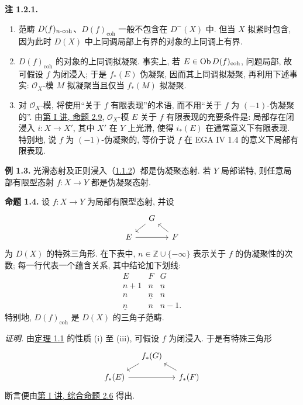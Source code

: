 \textbf{注 1.2.1.}
\begin{enumerate}[label=\alph*)]
\item 范畴 \(D(f)_{n\text{-}\mathrm{coh}}\)、\(D(f)_{\mathrm{coh}}\) 一般不包含在 \(D^{-}(X)\) 中. 但当 \(X\) 拟紧时包含, 因为此时 \(D(X)\) 中上同调局部上有界的对象的上同调上有界.

\item \(D(f)_{\mathrm{coh}}\) 的对象的上同调拟凝聚. 事实上, 若 \(E\in \operatorname{Ob} D(f)_{\mathrm{coh}}\), 问题局部, 故可假设 \(f\) 为闭浸入; 于是 \(f_*(E)\) 伪凝聚, 因而其上同调拟凝聚, 再利用下述事实: \(\mathcal O_X\)-模 \(M\) 拟凝聚当且仅当 \(f_*(M)\) 拟凝聚.

\item 对 \(\mathcal O_X\)-模, 将使用“关于 \(f\) 有限表现”的术语, 而不用“关于 \(f\) 为 \((-1)\)-伪凝聚的”. 由\hyperlink{sga6.e01.prop.2-9}{第 I 讲, 命题 2.9}, \(\mathcal O_X\)-模 \(E\) 关于 \(f\) 有限表现的充要条件是: 局部存在闭浸入 \(i:X\to X'\), 其中 \(X'\) 在 \(Y\) 上光滑, 使得 \(i_*(E)\) 在通常意义下有限表现. 特别地, 说 \(f\) 为 \((-1)\)-伪凝聚的, 等价于说 \(f\) 在 EGA IV 1.4 的意义下局部有限表现.
\end{enumerate}

\textbf{例 1.3.} 光滑态射及正则浸入（\hyperlink{sga6.e03.rem.1-1-2}{1.1.2}）都是伪凝聚态射. 若 \(Y\) 局部诺特, 则任意局部有限型态射 \(f:X\to Y\) 都是伪凝聚态射.

\textbf{命题 1.4.} 设 \(f:X\to Y\) 为局部有限型态射, 并设
\[
\begin{tikzcd}[column sep=small,row sep=small]
&G\arrow[dl]&\\
E\arrow[rr]&&F\arrow[ul]
\end{tikzcd}
\]
为 \(D(X)\) 的特殊三角形. 在下表中, \(n\in \mathbb Z\cup\{-\infty\}\) 表示关于 \(f\) 的伪凝聚性的次数; 每一行代表一个蕴含关系, 其中结论加下划线:
\[
\begin{array}{ccc}
E&F&G\\
n+1&n&\underline n\\
n&\underline n&n\\
\underline n&n&n-1.
\end{array}
\]
特别地, \(D(f)_{\mathrm{coh}}\) 是 \(D(X)\) 的三角子范畴.

\emph{证明.} 由\hyperlink{sga6.e03.thm.1-1}{定理 1.1} 的性质 (i) 至 (iii), 可假设 \(f\) 为闭浸入. 于是有特殊三角形
\[
\begin{tikzcd}[column sep=small,row sep=small]
&f_*(G)\arrow[dl]&\\
f_*(E)\arrow[rr]&&f_*(F)\arrow[ul]
\end{tikzcd}
\]
断言便由\hyperlink{sga6.e01.schol.2-6}{第 I 讲, 综合命题 2.6} 得出.

